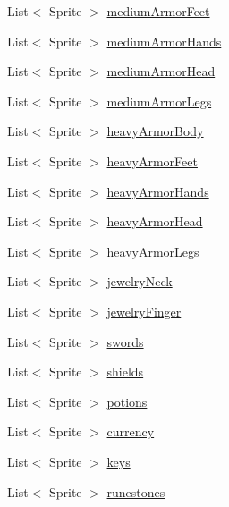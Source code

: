 \begin{DoxyCompactItemize}
\item 
List$<$ Sprite $>$ \mbox{\hyperlink{class_item_sprites_aece69dc2ef5775db624f59426c815882}{medium\+Armor\+Feet}}
\item 
List$<$ Sprite $>$ \mbox{\hyperlink{class_item_sprites_a710c2203db265ba5ae45d5e194347105}{medium\+Armor\+Hands}}
\item 
List$<$ Sprite $>$ \mbox{\hyperlink{class_item_sprites_a0d30c4c72b2dfe8d647835fbe61c98af}{medium\+Armor\+Head}}
\item 
List$<$ Sprite $>$ \mbox{\hyperlink{class_item_sprites_abe3254dfd4ed04f011fc2a9a396d0940}{medium\+Armor\+Legs}}
\item 
List$<$ Sprite $>$ \mbox{\hyperlink{class_item_sprites_a0f591387be8cc87947f8e63983b1f457}{heavy\+Armor\+Body}}
\item 
List$<$ Sprite $>$ \mbox{\hyperlink{class_item_sprites_acb4b6688d9157be764e77fbcdfb3979f}{heavy\+Armor\+Feet}}
\item 
List$<$ Sprite $>$ \mbox{\hyperlink{class_item_sprites_ace92c2b0f1cc1f4230210652c17aa94a}{heavy\+Armor\+Hands}}
\item 
List$<$ Sprite $>$ \mbox{\hyperlink{class_item_sprites_ab8cbbbf0055846461df6f9d67202b36d}{heavy\+Armor\+Head}}
\item 
List$<$ Sprite $>$ \mbox{\hyperlink{class_item_sprites_a2d27605263179ba8026d8cb53da8f07a}{heavy\+Armor\+Legs}}
\item 
List$<$ Sprite $>$ \mbox{\hyperlink{class_item_sprites_a9300f918883596e0fe67446651ffbf2f}{jewelry\+Neck}}
\item 
List$<$ Sprite $>$ \mbox{\hyperlink{class_item_sprites_a73fd7ee6163d0724a0cd4cd0726d2b34}{jewelry\+Finger}}
\item 
List$<$ Sprite $>$ \mbox{\hyperlink{class_item_sprites_aff0db6a06ded4b250ae835075f5ae8f9}{swords}}
\item 
List$<$ Sprite $>$ \mbox{\hyperlink{class_item_sprites_adbedbbca6d16894379af1b4dc63ab15a}{shields}}
\item 
List$<$ Sprite $>$ \mbox{\hyperlink{class_item_sprites_a7edcb72c95de6c7b10aead3a6e59ccb9}{potions}}
\item 
List$<$ Sprite $>$ \mbox{\hyperlink{class_item_sprites_aab1c64fdbd622d824d45fafcfd214ff6}{currency}}
\item 
List$<$ Sprite $>$ \mbox{\hyperlink{class_item_sprites_a5a4563f367a36043042b56d70f58fe0b}{keys}}
\item 
List$<$ Sprite $>$ \mbox{\hyperlink{class_item_sprites_ac41017b0ab64887f9dedbc827e78ce57}{runestones}}
\end{DoxyCompactItemize}



